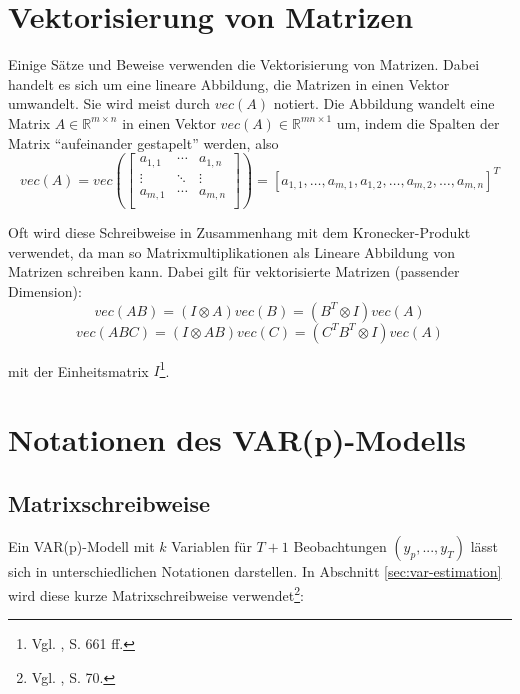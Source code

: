 \documentclass[
	a4paper,
	12pt,
	bibliography=totocnumbered,
	twoside,
]{scrreprt}
\begin{document}
\newpage
\section{Vektorisierung von Matrizen}
\label{app:matrixvector}
Einige Sätze und Beweise verwenden die Vektorisierung von Matrizen. Dabei handelt es sich um eine lineare Abbildung, die Matrizen in einen Vektor umwandelt. Sie wird meist durch $vec(A)$ notiert. Die Abbildung wandelt eine Matrix $A \in \mathbb{R}^{m \times n}$ in einen Vektor $vec(A) \in \mathbb{R}^{mn \times 1}$ um, indem die Spalten der Matrix "`aufeinander gestapelt"' werden, also
\begin{equation*}
    vec(A) = vec\left( \begin{bmatrix}
    a_{1,1} & \cdots & a_{1,n} \\
    \vdots & \ddots & \vdots \\
    a_{m,1} & \cdots & a_{m,n} \\
    \end{bmatrix} \right)
    =
    [a_{1,1} , \ldots , a_{m,1}, a_{1,2}, \ldots , a_{m,2} , \ldots , a_{m,n}]^T
\end{equation*}

Oft wird diese Schreibweise in Zusammenhang mit dem Kronecker-Produkt verwendet, da man so Matrixmultiplikationen als Lineare Abbildung von Matrizen schreiben kann. Dabei gilt für vektorisierte Matrizen (passender Dimension):
\begin{equation*}
    vec(AB) = (I \otimes A) vec(B) = (B^T \otimes I) vec(A)
\end{equation*}
\begin{equation*}
    vec(ABC) = (I \otimes AB) vec(C) = (C^T B^T \otimes I) vec(A)
\end{equation*}

mit der Einheitsmatrix $I$\footnote{Vgl. \cite{luetkepohl2005}, S. 661 ff.}.




\newpage
\section{Notationen des VAR(p)-Modells}
\label{app:var-notations}

\subsection*{Matrixschreibweise}
\label{app:var-notations-matrix}
Ein VAR(p)-Modell mit $k$ Variablen für $T+1$ Beobachtungen $(y_p, ..., y_T)$ lässt sich in unterschiedlichen Notationen darstellen. In Abschnitt \ref{sec:var-estimation} wird diese kurze Matrixschreibweise verwendet\footnote{Vgl. \citet{luetkepohl2005}, S. 70.}:
\end{document}

